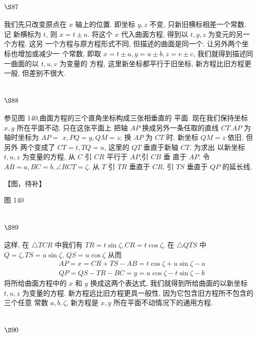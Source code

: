 \section{$\S 87$}

我们先只改变原点在 $x$ 轴上的位置. 即坐标 $y, z$ 不变, 只新旧横标相差一个常数. 记 新横标为 $t$, 则 $x=t \pm a$. 将这个 $x$ 代入曲面方程, 得到以 $t, y, z$ 为变元的另一个方程. 这另 一个方程与原方程形式不同, 但描述的曲面是同一个. 让另外两个坐标也增加或减少一 个常数, 即取 $x=t \pm a, y=u \pm b, z=v \pm c$, 我们就得到描述同一曲面的以 $t, u, v$ 为变量的 方程, 这里新坐标都平行于旧坐标, 新方程比旧方程更一般, 但差别不很大.

\section{$\S 88$}

参见图 140,曲面方程的三个直角坐标构成三张相垂直的 平面. 现在我们保持坐标 $x, y$ 所在平面不动, 只在这张平面上 把轴 $A P$ 换成另外一条任取的直线 $C T . A P$ 为轴时坐标为 $A P=$ $x, P Q=y, Q M=z$; 换 $A P$ 为 $C T$ 时, 新坐标 $Q M=z$ 依旧, 但另外 两个变成了 $C T=t, T Q=u$, 这里的 $Q T$ 垂直于新轴 $C T$. 为求出 以新坐标 $t, u, z$ 为变量的方程, 从 $C$ 引 $C R$ 平行于 $A P$,引 $C B$ 垂 直于 $A P$. 令 $A B=a, B C=b, \angle R C T=\zeta$. 从 $T$ 引 $T R$ 垂直于 $C R$, 引 $T S$ 垂直于 $Q P$ 的延长线.


【图，待补】

图 140 

\section{$\S 89$}

这样, 在 $\triangle T C R$ 中我们有 $T R=t \sin \zeta, C R=t \cos \zeta$, 在 $\triangle Q T S$ 中 $Q=\zeta, T S=u \sin \zeta$, $Q S=u \cos \zeta$ 从而
\[
\begin{aligned}
& A P=x=C R+T S-A B=t \cos \zeta+u \sin \zeta-a \\
& Q P=Q S-T R-B C=y=u \cos \zeta-t \sin \zeta-b
\end{aligned}
\]
将所给曲面方程中的 $x$ 和 $y$ 换成这两个表达式, 我们就得到所给曲面的以新坐标 $t, u, z$ 为变量的方程. 新方程远比旧方程更具一般性, 因为它包含旧方程所不包含的三个任意 常数 $a, b, \zeta$, 新方程是 $x, y$ 所在平面不动情况下的通用方程.

\section{$\S 90$}

